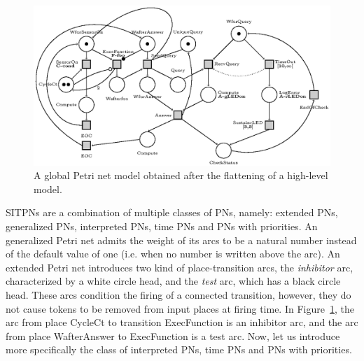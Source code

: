 \documentclass[pdflatex,sn-mathphys]{sn-jnl}%
\theoremstyle{thmstyleone}%
\theoremstyle{thmstyletwo}%
\theoremstyle{thmstylethree}%
\begin{document}
\begin{figure}[H]
\centering
\includegraphics[keepaspectratio=true,width=\textwidth] {impl-model.eps}
\caption[Global Petri net model.]{A global Petri net model obtained
  after the flattening of a \hilecop{} high-level model.}
\label{fig:impl-model}
\end{figure}

SITPNs are a combination of multiple classes of PNs, namely: extended
PNs, generalized PNs, interpreted PNs, time PNs and PNs with
priorities. An generalized Petri net admits the weight of its arcs to
be a natural number instead of the default value of one (i.e. when no
number is written above the arc). An extended Petri net introduces two
kind of place-transition arcs, the \textit{inhibitor} arc,
characterized by a white circle head, and the \textit{test} arc, which
has a black circle head. These arcs condition the firing of a
connected transition, however, they do not cause tokens to be removed
from input places at firing time. In Figure~\ref{fig:impl-model}, the
arc from place CycleCt to transition ExecFunction is an inhibitor arc,
and the arc from place WafterAnswer to ExecFunction is a test arc.
Now, let us introduce more specifically the class of interpreted PNs,
time PNs and PNs with priorities.
\end{document}
